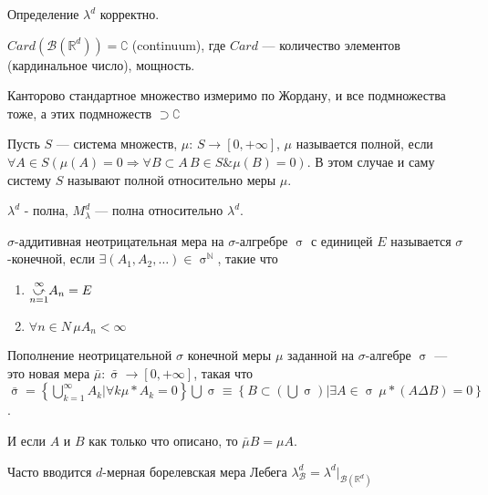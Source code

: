\documentclass[a4paper, 12pt]{article}
\begin{document}
\begin{enumerate}[a)]
    \begin{theorem}
        Определение $\lambda ^ d$ корректно.
    \end{theorem}
    
    \begin{remark}
        $Card(\mathcal{B}(\mathbb{R}^d)) = \complement$ (continuum), где $Card$ --- количество элементов (кардинальное число), мощность.
    \end{remark}

    \begin{example}
        Канторово стандартное множество измеримо по Жордану, и все подмножества тоже, а этих подмножеств $\supset \complement$ 
    \end{example}

    \begin{definition}
        Пусть $S$ --- система множеств, $\mu:\, S \rightarrow [0, +\infty]$, $\mu$ называется полной, если $\forall A \in S(\mu (A) = 0 \Rightarrow \forall B \subset A \, B \in S \& \mu (B) = 0)$. В этом случае и саму систему $S$ называют полной относительно меры $\mu$.
    \end{definition}

    \begin{consequence}
        $\lambda^d$ - полна, $M_{\lambda}^d$ --- полна относительно $\lambda^d$.
    \end{consequence}
    
    \begin{definition}
        $\sigma$-аддитивная неотрицательная мера на $\sigma$-алгребре $\upsigma$ с единицей $E$ называется $\sigma$-конечной, если $\exists (A_1, A_2, \dots) \in \upsigma^{\mathbb{N}}$, такие что
        \begin{enumerate}
            \item $\cuparr{n = 1}{\infty} A_n = E$
            \item $\forall n \in N\, \mu A_n < \infty$
        \end{enumerate}
    \end{definition}

    \begin{definition}
        Пополнение неотрицательной $\sigma$ конечной меры $\mu$ заданной на $\sigma$-алгебре $\upsigma$ --- это новая мера $\bar{\mu}: \bar{\upsigma} \rightarrow [0, +\infty]$, такая что $\bar{\upsigma} = \left\{ \bigcup \limits_{k = 1}^{\infty} A_k | \forall k \mu* A_k = 0\right\} \bigcup \upsigma \equiv \left\{ B \subset (\bigcup \upsigma) | \exists A \in \upsigma\, \mu*(A \Delta B) = 0 \right\}$.
    \end{definition}
    И если $A$ и $B$ как только что описано, то $\bar{\mu} B = \mu A$.

    Часто вводится $d$-мерная борелевская мера Лебега $\lambda^d_{\mathcal{B}} = \lambda^d \big|_{\mathcal{B}(\mathbb{R}^d)}$

\end{enumerate}
\end{document}
